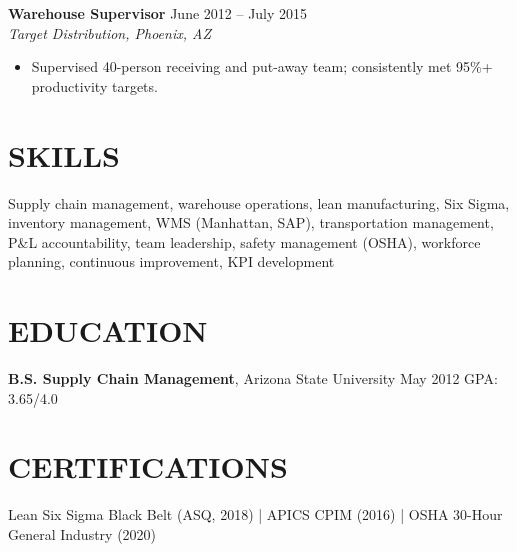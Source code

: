 \documentclass[11pt,a4paper]{article}
\begin{document}
\vspace{4pt}
\noindent\textbf{Warehouse Supervisor} \hfill June 2012 -- July 2015\\
\textit{Target Distribution, Phoenix, AZ}
\begin{itemize}
  \item Supervised 40-person receiving and put-away team; consistently met 95\%+ productivity targets.
\end{itemize}

\section{SKILLS}
Supply chain management, warehouse operations, lean manufacturing, Six Sigma, inventory management, WMS (Manhattan, SAP), transportation management, P\&L accountability, team leadership, safety management (OSHA), workforce planning, continuous improvement, KPI development

\section{EDUCATION}
\textbf{B.S. Supply Chain Management}, Arizona State University \hfill May 2012 \quad GPA: 3.65/4.0

\section{CERTIFICATIONS}
Lean Six Sigma Black Belt (ASQ, 2018) \quad | \quad APICS CPIM (2016) \quad | \quad OSHA 30-Hour General Industry (2020)
\end{document}
